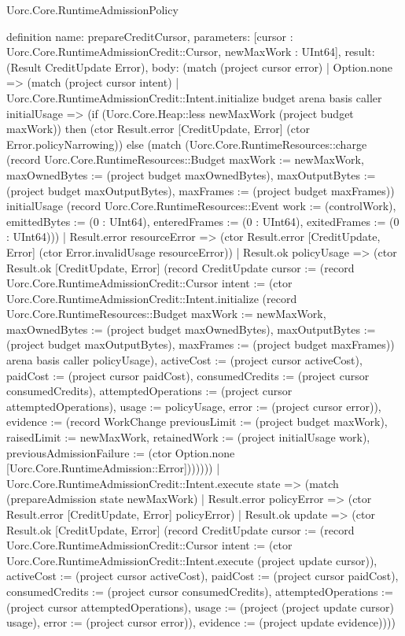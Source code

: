 \begin{lexlean}{Uorc.Core.RuntimeAdmissionPolicy}
\begin{semanticmodule}
definition{
  name: prepareCreditCursor,
  parameters: [cursor : Uorc.Core.RuntimeAdmissionCredit::Cursor, newMaxWork : UInt64],
  result: (Result CreditUpdate Error),
  body: (match (project cursor error)
    | Option.none => (match (project cursor intent)
      | Uorc.Core.RuntimeAdmissionCredit::Intent.initialize budget arena basis caller initialUsage => (if (Uorc.Core.Heap::less newMaxWork (project budget maxWork)) then (ctor Result.error [CreditUpdate, Error] (ctor Error.policyNarrowing)) else (match (Uorc.Core.RuntimeResources::charge (record Uorc.Core.RuntimeResources::Budget {maxWork := newMaxWork, maxOwnedBytes := (project budget maxOwnedBytes), maxOutputBytes := (project budget maxOutputBytes), maxFrames := (project budget maxFrames)}) initialUsage (record Uorc.Core.RuntimeResources::Event {work := (controlWork), emittedBytes := (0 : UInt64), enteredFrames := (0 : UInt64), exitedFrames := (0 : UInt64)}))
        | Result.error resourceError => (ctor Result.error [CreditUpdate, Error] (ctor Error.invalidUsage resourceError))
        | Result.ok policyUsage => (ctor Result.ok [CreditUpdate, Error] (record CreditUpdate {cursor := (record Uorc.Core.RuntimeAdmissionCredit::Cursor {intent := (ctor Uorc.Core.RuntimeAdmissionCredit::Intent.initialize (record Uorc.Core.RuntimeResources::Budget {maxWork := newMaxWork, maxOwnedBytes := (project budget maxOwnedBytes), maxOutputBytes := (project budget maxOutputBytes), maxFrames := (project budget maxFrames)}) arena basis caller policyUsage), activeCost := (project cursor activeCost), paidCost := (project cursor paidCost), consumedCredits := (project cursor consumedCredits), attemptedOperations := (project cursor attemptedOperations), usage := policyUsage, error := (project cursor error)}), evidence := (record WorkChange {previousLimit := (project budget maxWork), raisedLimit := newMaxWork, retainedWork := (project initialUsage work), previousAdmissionFailure := (ctor Option.none [Uorc.Core.RuntimeAdmission::Error])})}))))
      | Uorc.Core.RuntimeAdmissionCredit::Intent.execute state => (match (prepareAdmission state newMaxWork)
        | Result.error policyError => (ctor Result.error [CreditUpdate, Error] policyError)
        | Result.ok update => (ctor Result.ok [CreditUpdate, Error] (record CreditUpdate {cursor := (record Uorc.Core.RuntimeAdmissionCredit::Cursor {intent := (ctor Uorc.Core.RuntimeAdmissionCredit::Intent.execute (project update cursor)), activeCost := (project cursor activeCost), paidCost := (project cursor paidCost), consumedCredits := (project cursor consumedCredits), attemptedOperations := (project cursor attemptedOperations), usage := (project (project update cursor) usage), error := (project cursor error)}), evidence := (project update evidence)})))
}
\end{semanticmodule}
\end{lexlean}
